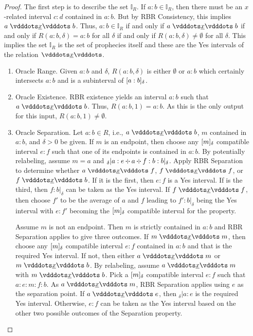 \documentclass[12pt]{article}
\begin{document}
\begin{proof}

    The first step is to describe the set $\mathbb{I}_R$. If $a:b \in \mathbb{I}_R$, then there must be an $x$-related interval $c:d$ contained in $a:b$. But by RBR Consistency, this implies $a \xrel b$. Thus, $a:b \in \mathbb{I}_R$ if and only if $a \xrel b$ if and only if $R(a:b, \delta) = a:b$ for all $\delta$ if and only if $R(a:b, \delta) \neq \emptyset$ for all $\delta$. This implies the set $\mathbb{I}_R$ is the set of prophecies itself and these are the Yes intervals of the relation $\xrel$. 

    \begin{enumerate}
        \item Oracle Range. Given $a:b$ and $\delta$, $R(a:b, \delta)$ is either $\emptyset$ or $a:b$ which certainly intersects $a:b$ and is a subinterval  of $[a:b]_{\delta}$.
        \item Oracle Existence. RBR existence yields an interval $a:b$ such that $a \xrel b$. Thus, $R(a:b, 1) = a:b$. As this is the only output for this input, $R(a:b, 1) \neq \emptyset$. 
        \item Oracle Separation. Let $a:b \in R$, i.e., $a \xrel b$, $m$ contained in $a:b$, and $\delta >0$ be given. If $m$ is an endpoint, then choose any $[m]_{\delta}$ compatible interval $e:f$ such that one of its endpoints is contained in $a:b$. By potentially relabeling, assume $m =a$ and ${}_\delta |a:e\betneq a \betneq f:b:b|_\delta$. Apply RBR Separation to determine whether $a \xrel f$, $f \xrel f$, or $f \xrel b$. If it is the first, then $e:f$ is a Yes interval. If is the third, then $f:b|_\delta$ can be taken as the Yes interval. If $f \xrel f$, then choose $f'$ to be the average of $a$ and $f$ leading to $f':b|_\delta$ being the Yes interval with $e:f'$ becoming the $[m]_{\delta}$ compatible interval for the property. 

        Assume $m$ is not an endpoint. Then $m$ is strictly contained in $a:b$ and RBR Separation applies to give three outcomes. If $m \xrel m$, then choose any $[m]_{\delta}$ compatible interval $e:f$  contained in $a:b$ and that is the required Yes interval. If not, then either $a \xrel m$ or $m \xrel b$. By relabeling, assume $a \xrel m$ with \sout{$m \xrel b$}. Pick a $[m]_{\delta}$ compatible interval $e:f$ such that $a:e:m:f:b$. As $a \xrel m$, RBR Separation applies using $e$ as the separation point. If $a \xrel e$, then ${}_\delta | a:e$ is the required Yes interval. Otherwise, $e:f$ can be taken as the Yes interval based on the other two possible outcomes of the Separation property. 


\end{enumerate}
\end{proof}
\end{document}
